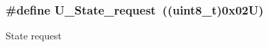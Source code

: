 \subsubsection[{\texorpdfstring{U\+\_\+\+State\+\_\+request}{U_State_request}}]{\setlength{\rightskip}{0pt plus 5cm}\#define U\+\_\+\+State\+\_\+request~((uint8\+\_\+t)0x02\+U)}\hypertarget{group___u_a_r_t___control___to_ga8dda3117e8869a900e5c5fe6f1b3a768}{}\label{group___u_a_r_t___control___to_ga8dda3117e8869a900e5c5fe6f1b3a768}
State request 